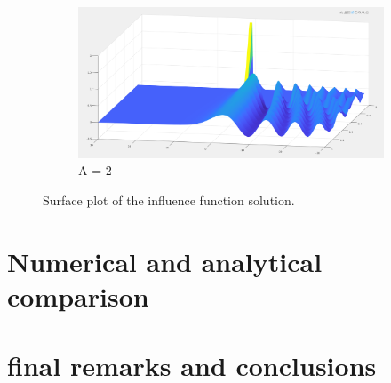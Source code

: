 \documentclass{article}
\begin{document}
\begin{figure}[H]
\begin{subfigure}[b]{60mm}
\includegraphics[scale=0.1]{figures/infl2V.png}
\caption{A = 2}
\label{fig:}
\end{subfigure}

\caption{Surface plot of the influence function solution.}
\label{fig:}
\end{figure}
\section{Numerical and analytical comparison}

\section{final remarks and conclusions}
\end{document}
